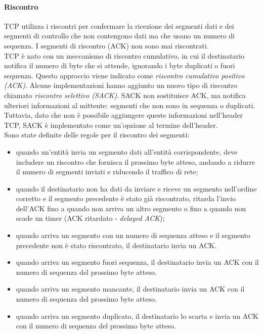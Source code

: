 \documentclass[12pt]{report}
\begin{document}
	\paragraph{Riscontro}
	TCP utilizza i riscontri per confermare la ricezione dei segmenti dati e dei segmenti di controllo che non contengono dati ma che usano un numero di sequenza. I segmenti di riscontro (ACK) non sono mai riscontrati.
	\vspace{\baselineskip}\\
	TCP è nato con un meccanismo di riscontro cumulativo, in cui il destinatario notifica il numero di byte che si attende, ignorando i byte duplicati o fuori sequenza. Questo approccio viene indicato come \textit{riscontro cumulativo positivo (ACK)}. Alcune implementazioni hanno aggiunto un nuovo tipo di riscontro chiamato \textit{riscontro selettivo (SACK)}. SACK non sostituisce ACK, ma notifica ulteriori informazioni al mittente: segmenti che non sono in sequenza o duplicati. Tuttavia, dato che non è possibile aggiungere queste informazioni nell'header TCP, SACK è implementato come un'opzione al termine dell'header.
	\vspace{\baselineskip}\\
	Sono state definite delle regole per il riscontro dei segmenti:
	\begin{itemize}
		\item quando un'entità invia un segmento dati all'entità corrispondente, deve includere un riscontro che fornisca il prossimo byte atteso, andando a ridurre il numero di segmenti inviati e riducendo il traffico di rete;
		\item quando il destinatario non ha dati da inviare e riceve un segmento nell'ordine corretto e il segmento precedente è stato già riscontrato, ritarda l'invio dell'ACK fino a quando non arriva un altro segmento o fino a quando non scade un timer (ACK ritardato - \textit{delayed ACK});
		\item quando arriva un segmento con un numero di sequenza atteso e il segmento precedente non è stato riscontrato, il destinatario invia un ACK.
		\item quando arriva un segmento fuori sequenza, il destinatario invia un ACK con il numero di sequenza del prossimo byte atteso.
		\item quando arriva un segmento mancante, il destinatario invia un ACK con il numero di sequenza del prossimo byte atteso.
		\item quando arriva un segmento duplicato, il destinatario lo scarta e invia un ACK con il numero di sequenza del prossimo byte atteso.
	\end{itemize}
\end{document}
